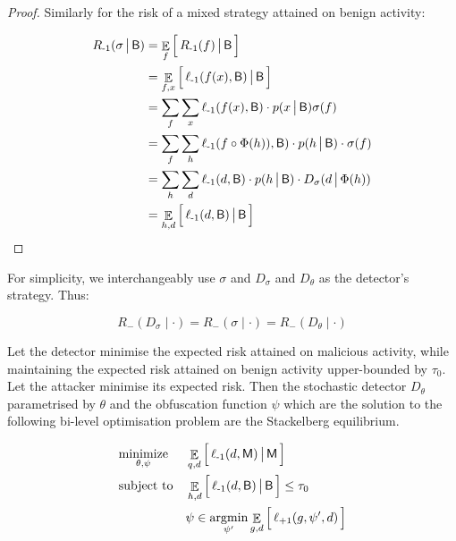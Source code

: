 \begin{proof}
Similarly for the risk of a mixed strategy attained on benign activity:

\begin{align}
    R_{{\text{-}1}}(\sigma \,\big|\, \mathsf{B}) &= \mathop{\mathbb{E}}_f \Big[\, R_{{\text{-}1}}(f) \,\big|\, \mathsf{B} \,\Big] \\
    &= \mathop{\mathbb{E}}_{f, x} \Big[\, \ell_{{\text{-}1}}(f(x), \mathsf{B}) \,\big|\, \mathsf{B} \,\Big] \\
    &= \sum_f \sum_x \ell_{{\text{-}1}}(f(x), \mathsf{B})  \cdot p(x \,\big|\, \mathsf{B}) \sigma(f) \\
    &= \sum_f \sum_h \ell_{{\text{-}1}}( f \circ \Phi(h) ), \mathsf{B}) \cdot  p(h \,\big|\, \mathsf{B})  \cdot \sigma(f) \\
    &= \sum_h \sum_d \ell_{{\text{-}1}}(d, \mathsf{B})  \cdot p(h \,\big|\, \mathsf{B}) \cdot  D_\sigma(d \,\big|\, \Phi(h)) \\
    &= \mathop{\mathbb{E}}_{h, d} \Big[\, \ell_{{\text{-}1}}(d, \mathsf{B}) \,\big|\, \mathsf{B} \,\Big]
\end{align}
\end{proof}

\begin{definition}
    For simplicity, we interchangeably use $\sigma$ and $D_\sigma$ and $D_\theta$ as the detector's strategy. Thus:

    \begin{equation*}
         R_\minus(D_\sigma \mid \cdot) = R_\minus(\sigma \mid \cdot) = R_\minus(D_\theta \mid \cdot)
    \end{equation*}

\end{definition}


\begin{proposition}
    Let the detector minimise the expected risk attained on malicious activity, while maintaining the expected risk attained on benign activity upper-bounded by $\tau_0$. Let the attacker minimise its expected risk. Then the stochastic detector $D_\theta$ parametrised by $\theta$ and the obfuscation function $\psi$ which are the solution to the following bi-level optimisation problem are the Stackelberg equilibrium.

    \begin{equation*}
        \begin{aligned}
        & \underset{\theta, \psi} {\text{minimize}}
        & & \mathop{\mathbb{E}}_{q, d} \Big[\, \ell_{{\text{-}1}} (d, \mathsf{M}) \,\big|\, \mathsf{M} \,\Big] \\
        & \text{subject to}
        & & \mathop{\mathbb{E}}_{h, d} \Big[\, \ell_{{\text{-}1}}(d, \mathsf{B}) \,\big|\, \mathsf{B} \,\Big] \le \tau_0 \\
        & & & \psi \in \mathop{\text{argmin}}_{\psi'} \mathop{\mathbb{E}}_{g,d} \Big[\, \ell_{{\text{+}1}} (g, \psi', d) \,\Big]
        \end{aligned}
    \end{equation*}

    \label{prop:detector_optimisation}
\end{proposition}

